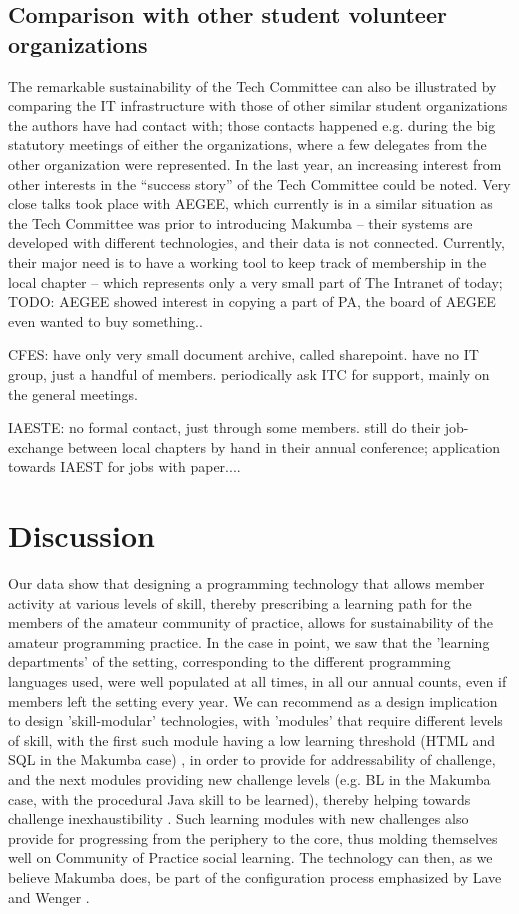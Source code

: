 \documentclass{acm_proc_article-sp}
\begin{document}
\subsection{Comparison with other student volunteer organizations}
The remarkable sustainability of the Tech Committee can also be illustrated by comparing the IT infrastructure with those of other similar student organizations the authors have had contact with; those contacts happened e.g. during the big statutory meetings of either the organizations, where a few delegates from the other organization were represented. In the last year, an increasing interest from other interests in the ``success story'' of the Tech Committee could be noted. Very close talks took place with AEGEE, which currently is in a similar situation as the Tech Committee was prior to introducing Makumba -- their systems are developed with different technologies, and their data is not connected. Currently, their major need is to have a working tool to keep track of membership in the local chapter -- which represents only a very small part of The Intranet of today;
TODO: AEGEE showed interest in copying a part of PA, the board of AEGEE even wanted to buy something..

CFES: have only very small document archive, called sharepoint. have no IT group, just a handful of members. periodically ask ITC for support, mainly on the general meetings.

IAESTE: no formal contact, just through some members. still do their job-exchange between local chapters by hand in their annual conference; application towards IAEST for  jobs with paper....


\section{Discussion}\label{sec:disco}
Our data show that designing a programming technology that allows member activity at various levels of skill, thereby prescribing a learning path for the members of the amateur community of practice, allows for sustainability of the amateur programming practice. In the case in point, we saw that the 'learning departments' of the setting, corresponding to the different programming languages used, were well populated at all times, in all our annual counts,  even if members left the setting every year. We can recommend as a design implication to design 'skill-modular' technologies, with 'modules' that require different levels of skill, with the first such module having a low learning threshold (HTML and SQL in the Makumba case) , in order to provide for addressability of challenge, and the next modules providing new challenge levels (e.g. BL in the Makumba case, with the procedural Java skill to be learned), thereby helping towards challenge inexhaustibility \cite{bogdan_bowers07}. Such learning modules with new challenges also provide for progressing from the periphery to the core, thus molding themselves well on Community of Practice social learning. The technology can then, as we believe Makumba does, be part of the configuration process emphasized by Lave and Wenger \cite{lave_wenger91}.
\end{document}
